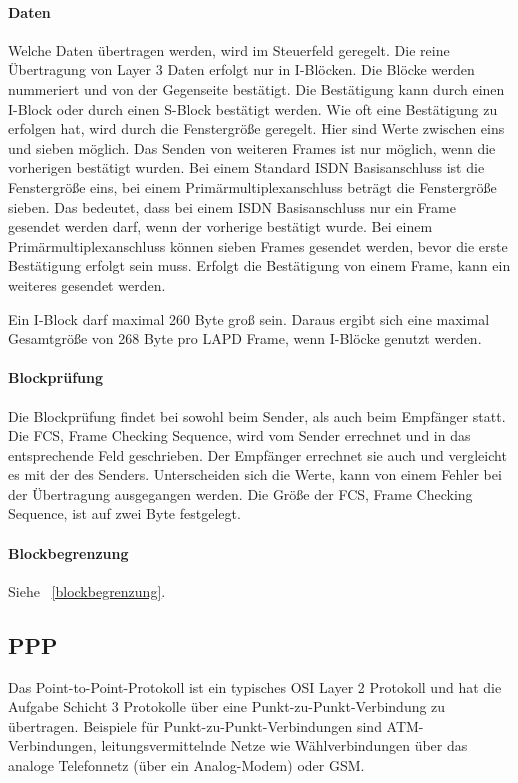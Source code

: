 \documentclass[12pt, a4paper, ngerman]{article}
\newcommand{\fcs}{FCS, Frame Checking Sequence,\xspace}
\begin{document}
\paragraph{Daten}
Welche Daten übertragen werden, wird im Steuerfeld geregelt. Die reine Übertragung von Layer 3 Daten erfolgt nur in I-Blöcken. Die Blöcke werden nummeriert und von der Gegenseite bestätigt. Die Bestätigung kann durch einen I-Block oder durch einen S-Block bestätigt werden. Wie oft eine Bestätigung zu erfolgen hat, wird durch die Fenstergröße geregelt. Hier sind Werte zwischen eins und sieben möglich. Das Senden von weiteren Frames ist nur möglich, wenn die vorherigen bestätigt wurden. Bei einem Standard ISDN Basisanschluss ist die Fenstergröße eins, bei einem Primärmultiplexanschluss beträgt die Fenstergröße sieben. Das bedeutet, dass bei einem ISDN Basisanschluss nur ein Frame gesendet werden darf, wenn der vorherige bestätigt wurde. Bei einem Primärmultiplexanschluss können sieben Frames gesendet werden, bevor die erste Bestätigung erfolgt sein muss. Erfolgt die Bestätigung von einem Frame, kann ein weiteres gesendet werden.

Ein I-Block darf maximal 260 Byte groß sein. Daraus ergibt sich eine maximal Gesamtgröße von 268 Byte pro LAPD Frame, wenn I-Blöcke genutzt werden.

\paragraph{Blockprüfung}
Die Blockprüfung findet bei sowohl beim Sender, als auch beim Empfänger statt. Die \fcs wird vom Sender errechnet und in das entsprechende Feld geschrieben. Der Empfänger errechnet sie auch und vergleicht es mit der des Senders. Unterscheiden sich die Werte, kann von einem Fehler bei der Übertragung ausgegangen werden. Die Größe der \fcs ist auf zwei Byte festgelegt.
 
\paragraph{Blockbegrenzung}
Siehe ~\ref{blockbegrenzung}.
 
\subsection{PPP}

Das Point-to-Point-Protokoll ist ein typisches OSI Layer 2 Protokoll und hat die Aufgabe Schicht 3 Protokolle über eine Punkt-zu-Punkt-Verbindung zu übertragen. Beispiele für Punkt-zu-Punkt-Verbindungen sind ATM-Verbindungen, leitungsvermittelnde Netze wie Wählverbindungen über das analoge Telefonnetz (über ein Analog-Modem) oder GSM.
\end{document}
